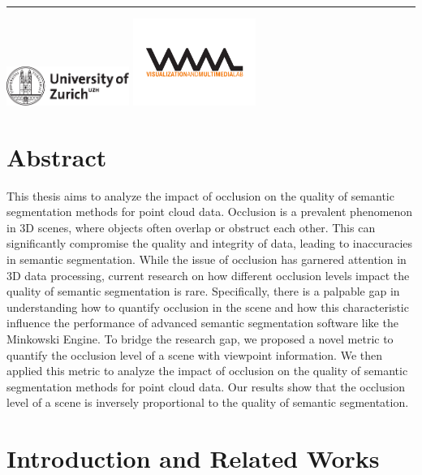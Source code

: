 \documentclass[11pt, a4paper,oneside,chapterprefix=false]{scrbook}
\newcommand{\FIXME}[1]{{\color{RED}{\textbf{FIX}: #1}}}
\begin{document}
\begin{titlepage}
	\vfill
	\hrule
	\vspace{0.5cm}
	\includegraphics*[width=0.3\textwidth]{figures/uzh_logo} \hfill
	\includegraphics*[width=0.3\textwidth]{figures/vmml_logo}
\end{titlepage}

\chapter{Abstract} \label{chp:abstract}

This thesis aims to analyze the impact of occlusion on the quality of semantic segmentation methods for point cloud data. Occlusion is a prevalent phenomenon in 3D scenes, where objects often overlap or obstruct each other. This can significantly compromise the quality and integrity of data, leading to inaccuracies in semantic segmentation. While the issue of occlusion has garnered attention in 3D data processing, current research on how different occlusion levels impact the quality of semantic segmentation is rare. Specifically, there is a palpable gap in understanding how to quantify occlusion in the scene and how this characteristic influence the performance of advanced semantic segmentation software like the Minkowski Engine. To bridge the research gap, we proposed a novel metric to quantify the occlusion level of a scene with viewpoint information. We then applied this metric to analyze the impact of occlusion on the quality of semantic segmentation methods for point cloud data. Our results show that the occlusion level of a scene \FIXME{not inverse} is inversely proportional to the quality of semantic segmentation.

\tableofcontents

\mainmatter

\chapter{Introduction and Related Works} \label{chp:introduction}
\end{document}
